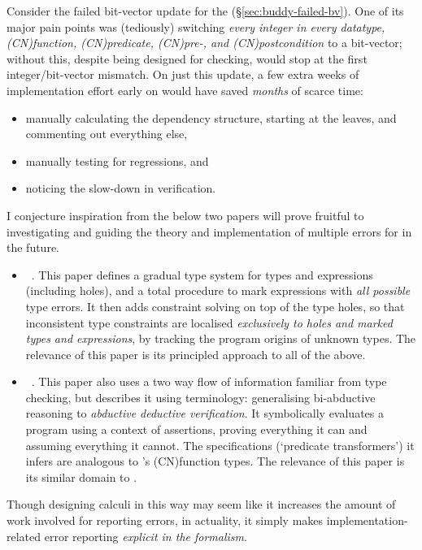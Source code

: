 Consider the failed bit-vector update for the 
(\S\ref{sec:buddy-failed-bv}). One of its major pain points was (tediously)
switching \emph{every integer in every datatype, \kl(CN){function},
\kl(CN){predicate}, \kl(CN){pre-}, and \kl(CN){postcondition}} to a bit-vector; without
this, despite being designed for \emph{} checking, 
would stop at the first integer/bit-vector mismatch. On just this update, a few
extra weeks of implementation effort early on would have saved \emph{months} of
scarce time:
\begin{itemize}
    \item manually calculating the dependency structure, starting at the
        leaves, and commenting out everything else,
    \item manually testing for regressions, and
    \item noticing the slow-down in verification.
\end{itemize}

I conjecture inspiration from the below two papers will prove fruitful
to investigating and guiding the theory and implementation of multiple
errors for  in the future.
\begin{itemize}
    \item {}~.
        This paper defines a  gradual
        type system for types and expressions (including holes), and a total
        procedure to mark expressions with \emph{all possible} type errors. It
        then adds constraint solving on top of the type holes, so that
        inconsistent type constraints are localised \emph{exclusively to holes
        and marked types and expressions}, by tracking the program origins of
        unknown types. The relevance of this paper is its principled approach
        to all of the above.
    \item {}~.
        This paper also uses a two way flow of
        information familiar from  type checking, but describes it
        using  terminology: generalising bi-abductive reasoning
        to \emph{abductive deductive verification}. It symbolically evaluates a
        program using a context of  assertions, proving
        everything it can and assuming everything it cannot. The specifications
        (`predicate transformers') it infers are analogous to 's
        \kl(CN){function types}. The relevance of this paper is its similar
        domain to .
\end{itemize}
Though designing calculi in this way may seem like it increases the amount
of work involved for reporting errors, in actuality, it simply makes
implementation-related error reporting \emph{explicit in the formalism}.

